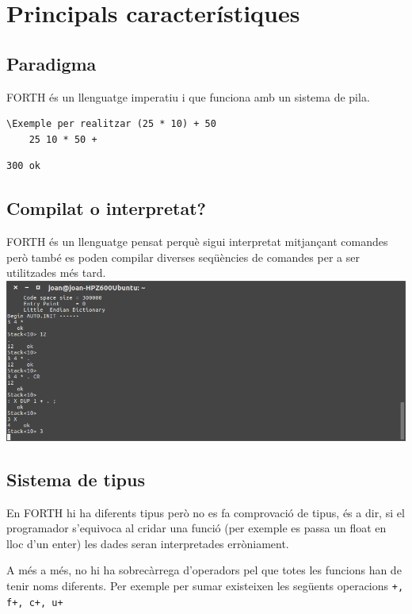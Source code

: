 \documentclass{beamer}
\begin{document}
\section{Principals característiques}
\subsection{Paradigma}
\begin{frame}[fragile]
    
    FORTH és un llenguatge imperatiu i que funciona amb un sistema de pila.
    
    \begin{lstlisting}[frame=single]
    \Exemple per realitzar (25 * 10) + 50
    25 10 * 50 +
    \end{lstlisting}
    \begin{lstlisting}[frame=single,language=TeX]
    300 ok
    \end{lstlisting}
\end{frame}

\subsection{Compilat o interpretat?}
\begin{frame}
    FORTH és un llenguatge pensat perquè sigui interpretat mitjançant comandes però també es poden compilar diverses seqüències de comandes per a ser utilitzades més tard.
    \vfill
    \centering
    \includegraphics[height=0.5\textheight]{console_1}
\end{frame}

\subsection{Sistema de tipus}

\begin{frame}
    En FORTH hi ha diferents tipus però no es fa comprovació de tipus, és a dir, si el programador s'equivoca al cridar una funció (per exemple es passa un float en lloc d'un enter) les dades seran interpretades erròniament.
    
    A més a més, no hi ha sobrecàrrega d'operadors pel que totes les funcions han de tenir noms diferents.
    Per exemple per sumar existeixen les següents operacions
    \texttt{+, f+, c+, u+}
\end{frame}
\end{document}
